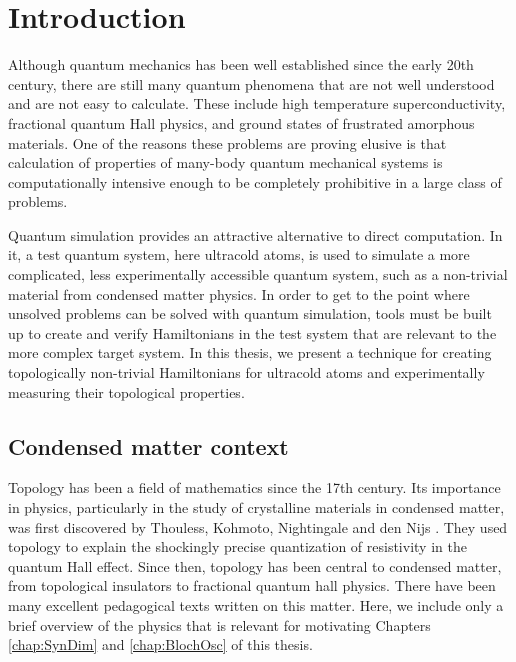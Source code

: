 \renewcommand{\thechapter}{1}

\chapter{Introduction}\label{chap:Chern}
Although quantum mechanics has been well established since the early 20th century, there are still many quantum phenomena that are not well understood and are not easy to calculate. These include high temperature superconductivity\cite{Dagotto1994,Lee2006}, fractional quantum Hall physics\cite{Stormer1999,Murthy2003}, and ground states of frustrated amorphous materials\cite{Berthier2011}. One of the reasons these problems are proving elusive is that calculation of properties of many-body quantum mechanical systems is computationally intensive enough to be completely prohibitive in a large class of problems. 

Quantum simulation provides an attractive alternative to direct computation. In it, a test quantum system, here ultracold atoms, is used to simulate a more complicated, less experimentally accessible quantum system, such as a non-trivial material from condensed matter physics. In order to get to the point where unsolved problems can be solved with quantum simulation, tools must be built up to create and verify Hamiltonians in the test system that are relevant to the more complex target system. In this thesis, we present a technique for creating topologically non-trivial Hamiltonians for ultracold atoms and experimentally measuring their topological properties.

\section{Condensed matter context}
Topology has been a field of mathematics since the 17th century. Its importance in physics, particularly in the study of crystalline materials in condensed matter, was first discovered by Thouless, Kohmoto, Nightingale and den Nijs \cite{Thouless1982}. They used topology to explain the shockingly precise quantization of resistivity in the quantum Hall effect. Since then, topology has been central to condensed matter, from topological insulators\cite{Qi2011} to fractional quantum hall physics\cite{Stormer1999}. There have been many excellent pedagogical texts written on this matter. Here, we include only a brief overview of the physics that is relevant for motivating Chapters \ref{chap:SynDim} and \ref{chap:BlochOsc} of this thesis.  

